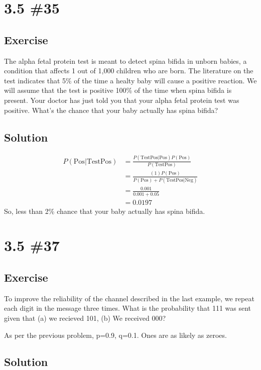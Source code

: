 \documentclass[12pt]{article}
\begin{document}
\section{3.5 \#35}
\subsection{Exercise}
The alpha fetal protein test is meant to detect spina bifida in unborn babies, a condition that affects 1 out of 1,000 children who are born. The literature on the test indicates that 5\% of the time a healty baby will cause a positive reaction.
We will assume that the test is positive 100\% of the time when spina bifida is present. Your doctor has just told
you that your alpha fetal protein test was positive. What's the chance that your baby actually has
spina bifida?

\subsection{Solution}
\begin{align*}
  P(\text{Pos}|\text{TestPos})&=\frac{P(\text{TestPos}|\text{Pos})P(\text{Pos})}{P(\text{TestPos})}\\
                              &=\frac{(1)P(\text{Pos})}{P(\text{Pos})+P(\text{TestPos}|\text{Neg})}\\
                              &=\frac{0.001}{0.001+0.05}\\
                              &=0.0197
\end{align*}
So, less than 2\% chance that your baby actually has spina bifida.

\section{3.5 \#37}
\subsection{Exercise}
To improve the reliability of the channel described in the last example, we repeat each digit in the message three times.
What is the probability that 111 was sent given that (a) we recieved 101, (b) We received 000?

As per the previous problem, p=0.9, q=0.1. Ones are as likely as zeroes.

\subsection{Solution}
\end{document}
